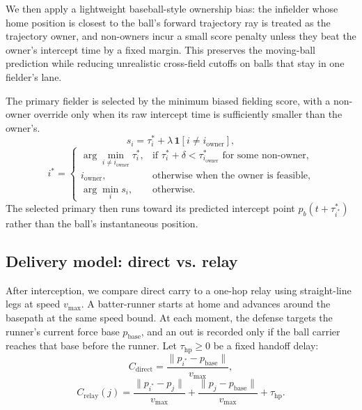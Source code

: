 \documentclass[conference]{IEEEtran}
\begin{document}
\noindent We then apply a lightweight baseball-style ownership bias: the infielder whose home position is closest to the ball's forward trajectory ray is treated as the trajectory owner, and non-owners incur a small score penalty unless they beat the owner's intercept time by a fixed margin. This preserves the moving-ball prediction while reducing unrealistic cross-field cutoffs on balls that stay in one fielder's lane.

\noindent The primary fielder is selected by the minimum biased fielding score, with a non-owner override only when its raw intercept time is sufficiently smaller than the owner's.
\begin{equation}
s_i = \tau_i^\ast + \lambda \,\mathbf{1}[i \neq i_{\mathrm{owner}}],
\end{equation}
\begin{equation}
i^\ast =
\begin{cases}
\arg\min_{i \neq i_{\mathrm{owner}}} \tau_i^\ast, & \text{if } \tau_i^\ast + \delta < \tau_{i_{\mathrm{owner}}}^\ast \text{ for some non-owner,}\\
i_{\mathrm{owner}}, & \text{otherwise when the owner is feasible,}\\
\arg\min_i s_i, & \text{otherwise.}
\end{cases}
\end{equation}
\noindent The selected primary then runs toward its predicted intercept point \(p_b(t+\tau_{i^\ast}^\ast)\) rather than the ball's instantaneous position.

\subsection{Delivery model: direct vs. relay}
After interception, we compare direct carry to a one-hop relay using straight-line legs at speed \(v_{\max}\). A batter-runner starts at home and advances around the basepath at the same speed bound. At each moment, the defense targets the runner's current force base \(p_{\mathrm{base}}\), and an out is recorded only if the ball carrier reaches that base before the runner. Let \(\tau_{\mathrm{hp}}\ge 0\) be a fixed handoff delay:
\begin{equation}
C_{\mathrm{direct}} = \frac{\|p_{i^\ast} - p_{\mathrm{base}}\|}{v_{\max}},
\end{equation}
\begin{equation}
C_{\mathrm{relay}}(j) = \frac{\|p_{i^\ast} - p_j\|}{v_{\max}} + \frac{\|p_j - p_{\mathrm{base}}\|}{v_{\max}} + \tau_{\mathrm{hp}}.
\end{equation}
\end{document}
